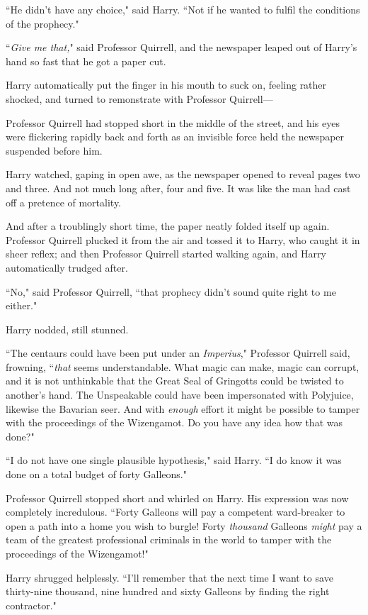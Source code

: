 ``He didn't have any choice," said Harry. ``Not if he wanted to fulfil the conditions of the prophecy."

``\emph{Give me that,}" said Professor Quirrell, and the newspaper leaped out of Harry's hand so fast that he got a paper cut.

Harry automatically put the finger in his mouth to suck on, feeling rather shocked, and turned to remonstrate with Professor Quirrell---

Professor Quirrell had stopped short in the middle of the street, and his eyes were flickering rapidly back and forth as an invisible force held the newspaper suspended before him.

Harry watched, gaping in open awe, as the newspaper opened to reveal pages two and three. And not much long after, four and five. It was like the man had cast off a pretence of mortality.

And after a troublingly short time, the paper neatly folded itself up again. Professor Quirrell plucked it from the air and tossed it to Harry, who caught it in sheer reflex; and then Professor Quirrell started walking again, and Harry automatically trudged after.

``No," said Professor Quirrell, ``that prophecy didn't sound quite right to me either."

Harry nodded, still stunned.

``The centaurs could have been put under an \emph{Imperius}," Professor Quirrell said, frowning, ``\emph{that} seems understandable. What magic can make, magic can corrupt, and it is not unthinkable that the Great Seal of Gringotts could be twisted to another's hand. The Unspeakable could have been impersonated with Polyjuice, likewise the Bavarian seer. And with \emph{enough} effort it might be possible to tamper with the proceedings of the Wizengamot. Do you have any idea how that was done?"

``I do not have one single plausible hypothesis," said Harry. ``I do know it was done on a total budget of forty Galleons."

Professor Quirrell stopped short and whirled on Harry. His expression was now completely incredulous. ``Forty Galleons will pay a competent ward-breaker to open a path into a home you wish to burgle! Forty \emph{thousand} Galleons \emph{might} pay a team of the greatest professional criminals in the world to tamper with the proceedings of the Wizengamot!"

Harry shrugged helplessly. ``I'll remember that the next time I want to save thirty-nine thousand, nine hundred and sixty Galleons by finding the right contractor."

